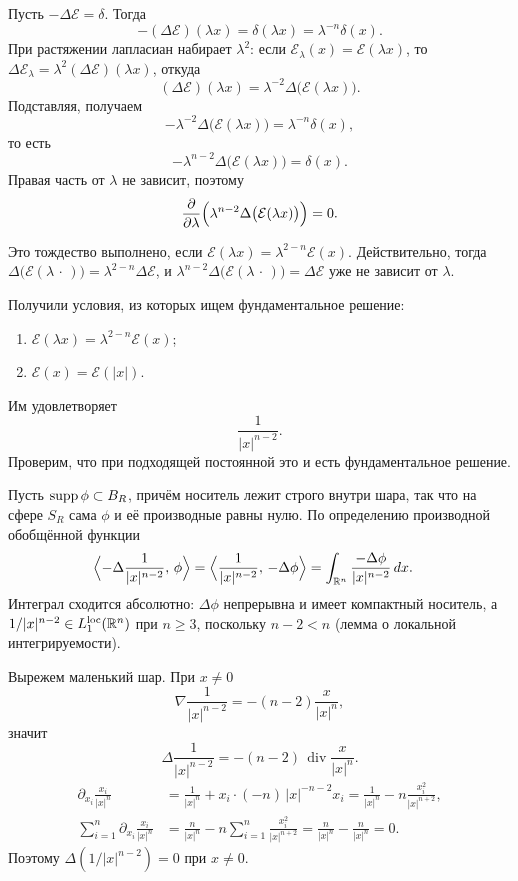 \documentclass[12pt,a4paper]{article}
\begin{document}
Пусть \(-\Delta\mathcal{E}=\delta\). Тогда
\[
-(\Delta\mathcal{E})(\lambda x)
=
\delta(\lambda x)
=
\lambda^{-n}\delta(x).
\]
При растяжении лапласиан набирает \(\lambda^2\):
если \(\mathcal{E}_\lambda(x)=\mathcal{E}(\lambda x)\), то
\(\Delta\mathcal{E}_\lambda=\lambda^2(\Delta\mathcal{E})(\lambda x)\), откуда
\[
(\Delta\mathcal{E})(\lambda x)
=
\lambda^{-2}\Delta\bigl(\mathcal{E}(\lambda x)\bigr).
\]
Подставляя, получаем
\[
-\lambda^{-2}\Delta\bigl(\mathcal{E}(\lambda x)\bigr)
=
\lambda^{-n}\delta(x),
\]
то есть
\[
-\lambda^{n-2}\Delta\bigl(\mathcal{E}(\lambda x)\bigr)
=
\delta(x).
\]
Правая часть от \(\lambda\) не зависит, поэтому
\[
\frac{\partial}{\partial\lambda}
\Bigl(\lambda^{n-2}\Delta\bigl(\mathcal{E}(\lambda x)\bigr)\Bigr)
=0.
\]

Это тождество выполнено, если
\(\mathcal{E}(\lambda x)=\lambda^{2-n}\mathcal{E}(x)\).
Действительно, тогда
\(\Delta\bigl(\mathcal{E}(\lambda\,\cdot\,)\bigr)=\lambda^{2-n}\Delta\mathcal{E}\),
и
\(\lambda^{n-2}\Delta\bigl(\mathcal{E}(\lambda\,\cdot\,)\bigr)=\Delta\mathcal{E}\)
уже не зависит от \(\lambda\).

Получили условия, из которых ищем фундаментальное решение:
\begin{enumerate}
\item \(\mathcal{E}(\lambda x)=\lambda^{2-n}\mathcal{E}(x)\);
\item \(\mathcal{E}(x)=\mathcal{E}(|x|)\).
\end{enumerate}
Им удовлетворяет
\[
\frac{1}{|x|^{n-2}}.
\]
Проверим, что при подходящей постоянной это и есть фундаментальное решение.

Пусть \(\operatorname{supp}\phi\subset B_R\), причём носитель лежит строго внутри шара,
так что на сфере \(S_R\) сама \(\phi\) и её производные равны нулю.
По определению производной обобщённой функции
\begin{align*}
\Bigl\langle
    -\Delta\frac{1}{|x|^{n-2}},\,
    \phi
\Bigr\rangle
&=
\Bigl\langle
    \frac{1}{|x|^{n-2}},\,
    -\Delta\phi
\Bigr\rangle
=
\int_{\mathbb{R}^n}
    \frac{-\Delta\phi}{|x|^{n-2}}\,dx.
\end{align*}
Интеграл сходится абсолютно: \(\Delta\phi\) непрерывна и имеет компактный носитель,
а \(1/|x|^{n-2}\in L_1^{\mathrm{loc}}(\mathbb{R}^n)\) при \(n\ge 3\),
поскольку \(n-2<n\) (лемма о локальной интегрируемости).

Вырежем маленький шар. При \(x\neq 0\)
\[
\nabla\frac{1}{|x|^{n-2}}
=
-(n-2)\frac{x}{|x|^n},
\]
значит
\[
\Delta\frac{1}{|x|^{n-2}}
=
-(n-2)\,
\operatorname{div}\frac{x}{|x|^n}.
\]
\begin{align*}
\partial_{x_i}\frac{x_i}{|x|^n}
&=
\frac{1}{|x|^n}
+
x_i\cdot(-n)\,|x|^{-n-2}x_i
=
\frac{1}{|x|^n}
-
n\frac{x_i^2}{|x|^{n+2}},
\\
\sum_{i=1}^n
\partial_{x_i}\frac{x_i}{|x|^n}
&=
\frac{n}{|x|^n}
-
n\sum_{i=1}^n\frac{x_i^2}{|x|^{n+2}}
=
\frac{n}{|x|^n}
-
\frac{n}{|x|^n}
=0.
\end{align*}
Поэтому \(\Delta(1/|x|^{n-2})=0\) при \(x\neq 0\).
\end{document}
